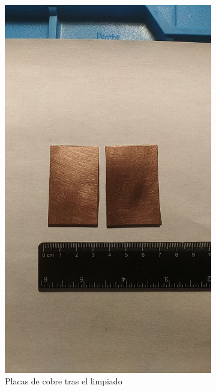 \begin{figure}[!htb]
\begin{subfigure}[b]{.475\textwidth}
        \includegraphics[width=1\textwidth, trim={0 350 0 450}, clip]{tfg/figuras/06_prototipado/limpiado/cobre_tratado.png}
        \caption{Placas de cobre tras el limpiado}
        \label{fig:tfg:06:placa_de_cobre_tratada}
    \end{subfigure}%
    \hfill
    \begin{subfigure}[b]{.475\textwidth}
        \centering

\end{subfigure}
\end{figure}
